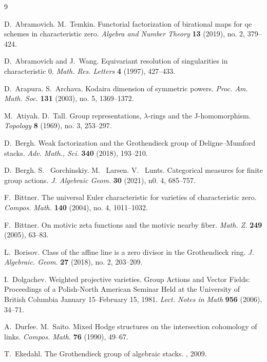 \documentclass{amsart}
\theoremstyle{definition}
\numberwithin{equation}{section}
\begin{document}
\begin{thebibliography}{9}

D.~Abramovich. M.~Temkin. Functorial factorization of birational maps for qe schemes in characteristic zero. \emph{Algebra and Number Theory} {\bf 13} (2019), no. 2, 379--424.

D.~Abramovich and J.~Wang. Equivariant resolution of singularities in characteristic 0.
\emph{Math. Res. Letters} {\bf 4} (1997), 427--433.

D.~Arapura. S.~Archava. Kodaira dimension of symmetric powers. \emph{Proc. Am. Math. Soc.} {\bf 131} (2003), no. 5, 1369--1372.

M.~Atiyah. D.~Tall. Group representations, $\lambda$-rings and the J-homomorphism. \emph{Topology} {\bf 8} (1969), no. 3, 253--297.

D.~Bergh. Weak factorization and the Grothendieck group of Deligne--Mumford stacks. \emph{Adv. Math., Sci.} {\bf 340} (2018), 193--210.

D.~Bergh. S. ~Gorchinskiy. M. ~Larsen. V. ~Lunts. Categorical measures for finite group actions. \emph{J. Algebraic Geom.} {\bf 30} (2021), n0. 4, 685--757.

F.~Bittner. The universal Euler characteristic for varieties of characteristic zero. \emph{Compos. Math.} {\bf 140} (2004), no. 4, 1011--1032.

F.~Bittner. On motivic zeta functions and the motivic nearby fiber. \emph{Math. Z.} {\bf 249} (2005), 63--83.

L.~Borisov. Class of the affine line is a zero divisor in the Grothendieck ring. \emph{J. Algebraic. Geom.} {\bf 27} (2018), no. 2, 203--209.

I.~Dolgachev. Weighted projective varieties. Group Actions and Vector Fields: Proceedings of a Polish-North American Seminar Held at the University of British Columbia January 15--February 15, 1981. \emph{Lect. Notes in Math} {\bf 956} (2006), 34--71.

A.~Durfee. M.~Saito. Mixed Hodge structures on the intersection cohomology of links. \emph{Compos. Math.} {\bf 76} (1990), 49--67.

T.~Ekedahl.
\newblock The Grothendieck group of algebraic stacks.
, 2009.


\end{thebibliography}
\end{document}
